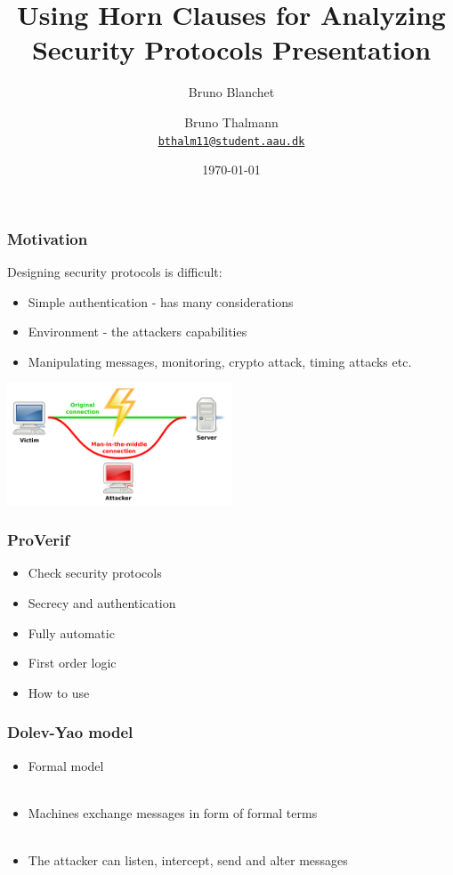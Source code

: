 \documentclass[10pt]{beamer}
\title{Using Horn Clauses for Analyzing Security Protocols Presentation}
\subtitle{Bruno Blanchet}  %
\date{\today}
\author{
  Bruno Thalmann\\
  \href{mailto:bthalm11@student.aau.dk}{{\tt bthalm11@student.aau.dk}}
}
\institute[
  Dept.\ of Computer Science\\
  Aalborg University\\
  Denmark
] %
{%
  Department of Computer Science\\
  Aalborg University\\
  Denmark
  
}
\begin{document}
{\aauwavesbg%
\begin{frame} %
  \titlepage
\end{frame}}


\begin{frame}
  \frametitle{Motivation}
   Designing security protocols is difficult:
  \begin{itemize}
  \item Simple authentication - has many considerations
  \item Environment - the attackers capabilities
  \item Manipulating messages, monitoring, crypto attack, timing attacks etc.
  \end{itemize}
  \begin{center}
    \includegraphics[width=0.5\textwidth]{graphics/man-in-the-middle.png}    
  \end{center}

\end{frame}

\begin{frame}
  \frametitle{ProVerif}
  \begin{itemize}
  \item Check security protocols
  \item Secrecy and authentication
  \item Fully automatic
  \item First order logic
  \item How to use
  \end{itemize}
\end{frame}


\begin{frame}
  \frametitle{Dolev-Yao model}
  \begin{itemize}
  \item Formal model
    \\~\\
  \item Machines exchange messages in form of formal terms
    \\~\\
  \item The attacker can listen, intercept, send and alter messages
  \end{itemize}
\end{frame}
\end{document}
